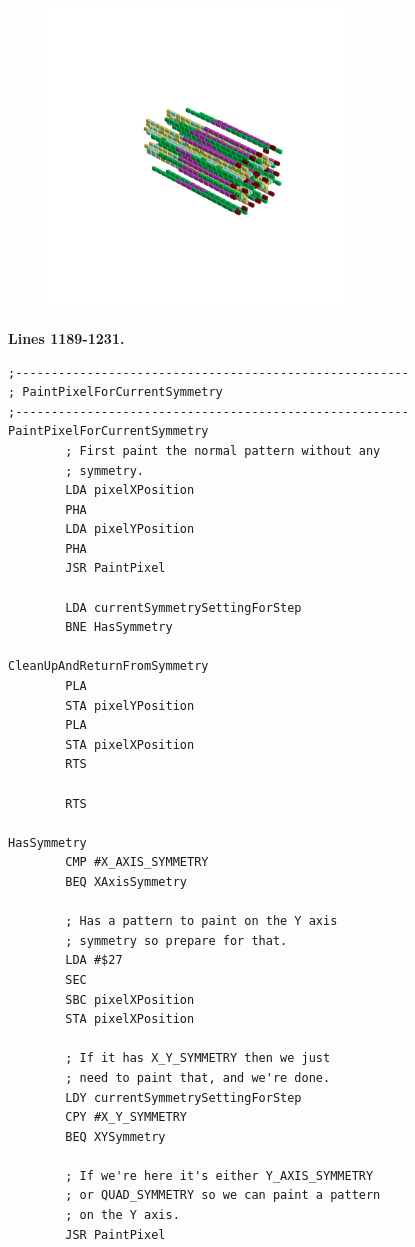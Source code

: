 \begin{minipage}[b]{0.50\linewidth}
\begin{figure}[H]
        \vspace*{-8cm}
        \hspace*{2cm}
        \includegraphics[width=8cm]{src/symmetries/pattern9_4-45.png}
        \vspace*{-2.5cm}
  \caption*{}
  \end{figure}
\end{minipage}

\clearpage
\textbf{Lines 1189-1231. }
\begin{lstlisting}
;-------------------------------------------------------
; PaintPixelForCurrentSymmetry
;-------------------------------------------------------
PaintPixelForCurrentSymmetry   
        ; First paint the normal pattern without any
        ; symmetry.
        LDA pixelXPosition
        PHA 
        LDA pixelYPosition
        PHA 
        JSR PaintPixel

        LDA currentSymmetrySettingForStep
        BNE HasSymmetry

CleanUpAndReturnFromSymmetry   
        PLA 
        STA pixelYPosition
        PLA 
        STA pixelXPosition
        RTS 

        RTS

HasSymmetry   
        CMP #X_AXIS_SYMMETRY
        BEQ XAxisSymmetry

        ; Has a pattern to paint on the Y axis
        ; symmetry so prepare for that.
        LDA #$27
        SEC 
        SBC pixelXPosition
        STA pixelXPosition

        ; If it has X_Y_SYMMETRY then we just 
        ; need to paint that, and we're done.
        LDY currentSymmetrySettingForStep
        CPY #X_Y_SYMMETRY
        BEQ XYSymmetry

        ; If we're here it's either Y_AXIS_SYMMETRY
        ; or QUAD_SYMMETRY so we can paint a pattern
        ; on the Y axis.
        JSR PaintPixel

\end{lstlisting}
\clearpage

